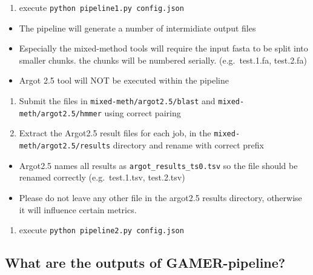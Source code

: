 \documentclass[11pt,letterpaper]{article}
\begin{document}
\begin{enumerate}
 \def\labelenumi{\arabic{enumi}.}
 \setcounter{enumi}{2}

 \item
       execute \texttt{python\ pipeline1.py\ config.json}
\end{enumerate}

\begin{itemize}

 \item
       The pipeline will generate a number of intermidiate output files
 \item
       Especially the mixed-method tools will require the input fasta to be
       split into smaller chunks. the chunks will be numbered serially.
       (e.g.~test.1.fa, test.2.fa)
 \item
       Argot 2.5 tool will NOT be executed within the pipeline
\end{itemize}

\begin{enumerate}
 \def\labelenumi{\arabic{enumi}.}
 \setcounter{enumi}{3}

 \item
       Submit the files in \texttt{mixed-meth/argot2.5/blast} and
       \texttt{mixed-meth/argot2.5/hmmer} using correct pairing
 \item
       Extract the Argot2.5 result files for each job, in the
       \texttt{mixed-meth/argot2.5/results} directory and rename with correct
       prefix
\end{enumerate}

\begin{itemize}

 \item
       Argot2.5 names all results as \texttt{argot\_results\_ts0.tsv} so the
       file should be renamed correctly (e.g.~test.1.tsv, test.2.tsv)
 \item
       Please do not leave any other file in the argot2.5 results directory,
       otherwise it will influence certain metrics.
\end{itemize}

\begin{enumerate}
 \def\labelenumi{\arabic{enumi}.}
 \setcounter{enumi}{5}

 \item
       execute \texttt{python\ pipeline2.py\ config.json}
\end{enumerate}

\subsection{What are the outputs of
 GAMER-pipeline?}\label{what-are-the-outputs-of-gamer-pipeline}
\end{document}
